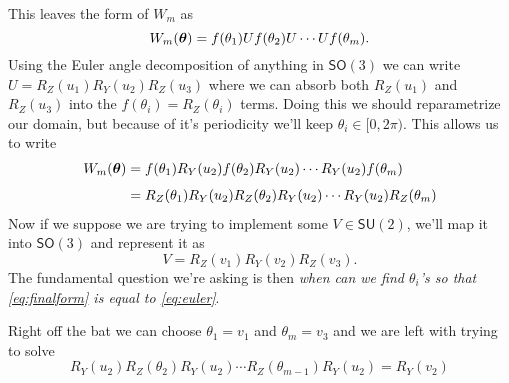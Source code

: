 \documentclass[12pt,dvipsnames]{article}
\newcommand{\SU}[1]{\mathsf{SU} (#1)}
\newcommand{\SO}[1]{\mathsf{SO} (#1)}
\newcommand{\1}{\mathbb{1}}
\theoremstyle{plain}
\begin{document}
This leaves the form of $W_m$ as
\begin{equation}
    W_m(\vb*{\theta}) = f(\theta_1)U f(\theta_2) U \cdots U f(\theta_m).
\end{equation}
Using the Euler angle decomposition of anything in $\SO{3}$ we can write $U = R_Z(u_1)R_Y(u_2)R_Z(u_3)$ where we can absorb both $R_Z(u_1)$ and $R_Z(u_3)$ into the $f(\theta_i) = R_Z(\theta_i)$ terms. Doing this we should reparametrize our domain, but because of it's periodicity we'll keep $\theta_i\in[0, 2\pi)$. %
This allows us to write
\begin{align}
    W_m(\vb*{\theta}) & = f(\theta_1)R_Y(u_2)f(\theta_2)R_Y(u_2)\cdots R_Y(u_2)f(\theta_m) \nonumber                  \\[0.4em]
                      & = R_Z(\theta_1)R_Y(u_2)R_Z(\theta_2)R_Y(u_2)\cdots R_Y(u_2)R_Z(\theta_m) \label{eq:finalform}
\end{align}
Now if we suppose we are trying to implement some $V\in\SU{2}$, we'll map it into $\SO{3}$ and represent it as
\begin{equation}\label{eq:euler}
    V = R_Z(v_1)R_Y(v_2)R_Z(v_3).
\end{equation}
The fundamental question we're asking is then \emph{when can we find $\theta_i$'s so that \cref{eq:finalform} is equal to \cref{eq:euler}}.

Right off the bat we can choose $\theta_1 = v_1$ and $\theta_m = v_3$ and we are left with trying to solve
\begin{equation}
    R_Y(u_2)R_Z(\theta_2)R_Y(u_2)\cdots R_Z(\theta_{m - 1})R_Y(u_2) = R_Y(v_2)
\end{equation}
\end{document}
